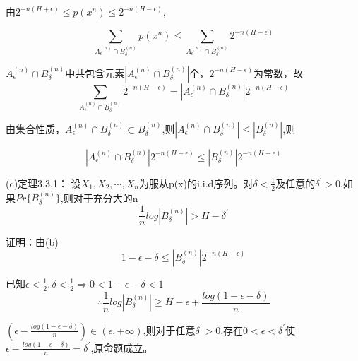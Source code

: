 \documentclass[UTF8]{ctexart}
\begin{document}
由$2^{-n(H+\epsilon)}\leqslant p(x^n)\leqslant 2^{-n(H-\epsilon)}$,

\begin{equation*}
\sum _{A_\epsilon^{(n)}\cap B_\delta^{(n)}}p(x^n)\leqslant \sum _{A_\epsilon^{(n)}\cap B_\delta^{(n)}}2^{-n(H-\epsilon)}
\end{equation*}

$A_\epsilon^{(n)}\cap B_\delta^{(n)}$中共包含元素$|A_\epsilon^{(n)}\cap B_\delta^{(n)}|$个，$ 2^{-n(H-\epsilon)}$为常数，故
\begin{equation*}
\sum _{A_\epsilon^{(n)}\cap B_\delta^{(n)}}2^{-n(H-\epsilon)}=|A_\epsilon^{(n)}\cap B_\delta^{(n)}|2^{-n(H-\epsilon)}
\end{equation*}

由集合性质，$A_\epsilon^{(n)}\cap B_\delta^{(n)}\subset B_\delta^{(n)} $,则$|A_\epsilon^{(n)}\cap B_\delta^{(n)}|\leqslant |B_\delta^{(n)}| $,则

\begin{equation*}
|A_\epsilon^{(n)}\cap B_\delta^{(n)}|2^{-n(H-\epsilon)}\leqslant |B_\delta^{(n)}|2^{-n(H-\epsilon)}
\end{equation*}

(c)定理3.3.1： 设$X_1,X_2,\cdots ,X_n$为服从p(x)的i.i.d序列。对$\delta < \frac{1}{2}$及任意的$\delta ^\prime >0$,如果$Pr\{B_\delta^{(n)}\}$,则对于充分大的n$$\frac{1}{n}log|B_\delta^{(n)}|>H-\delta^\prime$$

证明：由(b)$$1-\epsilon -\delta\leqslant |B_\delta^{(n)}|2^{-n(H-\epsilon)}$$

已知$\epsilon <\frac{1}{2}, \delta <\frac{1}{2}\Rightarrow 0<1-\epsilon-\delta <1$
$$\therefore\frac{1}{n}log|B_\delta^{(n)}|\geqslant H-\epsilon +\frac{log(1-\epsilon-\delta) }{n} $$

$(\epsilon -\frac{log(1-\epsilon-\delta)}{n})\in(\epsilon,+\infty )$,则对于任意$\delta^\prime>0$,存在$0<\epsilon<\delta^\prime$使$\epsilon -\frac{log(1-\epsilon-\delta)}{n}=\delta ^\prime $,原命题成立。
\end{document}
